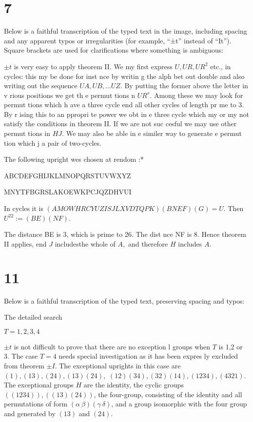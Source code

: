 \documentclass[12pt]{article}
\begin{document}
\section{7}

Below is a faithful transcription of the typed text in the image, including spacing and any apparent typos or irregularities (for example, ``±t'' instead of ``It''). 
Square brackets are used for clarifications where something is ambiguous:

\bigskip

\noindent
\(\pm t\) is very easy to apply theorem II. We my first express 
\(U, UR, UR^2\) etc., in cycles: this my be done for inst nce by 
writin g the alph bet out double and also writing out 
the sequence \(UA, UB, \ldots UZ\). By putting the former above the 
letter in v rious positions we get th e permut tions n \(UR^s\). 
Among these we may look for permut tions which h ave a three 
cycle end all other cycles of length pr me to 3. By r ising this 
to an ppropri te power we obt in e three cycle which my or my 
not satisfy the conditions in theorem II. If we are not 
suc cesful we may use other permut tions in \(H J\). We may also 
be able in e similer way to generate e permut tion which j 
a pair of two-cycles.

\bigskip

The following upright wes chosen at rendom :*

\bigskip

ABCDEFGHIJKLMNOPQRSTUVWXYZ

MNYTFBGRSLAKOEWKPCJQZDHVUI

\bigskip

In cycles it is \((AMOWHRCYUZISJLXVDTQPK)(BNEF)(G) = U\). 
Then \(U^{22} := (BE)(NF)\). 

\bigskip

The distance BE is 3, which is prime to 26. The dist nce NF is 
8. Hence theorem II applies, end \(J\) includesthe whole of \(A,\) 
and therefore \(H\) includes \(A\).

\section{11}

Below is a faithful transcription of the typed text, preserving spacing and typos:

\bigskip

\noindent
The detailed search

\(T = 1,2,3,4\)

\(\pm t\) is not difficult to prove that there are no exception l 
groups when \(T\) is 1,2 or 3. The case \(T=4\) needs special 
investigation as it has been expres ly excluded from theorem \(\pm I\). 
The exceptional uprights in this case are \((1), (13), (24), (13)(24),\) 
\((12)(34), (32)(14), (1234), (4321)\). The exceptional groups \(H\) 
are the identity, the cyclic groups \(((1234)), ((13)(24))\), the 
four-group, consisting of the identity and all permutations of 
form \((\alpha \ \beta)(\gamma \ \delta)\), and a group isomorphic with the four 
group and generated by \((13)\) and \((24)\).
\end{document}
